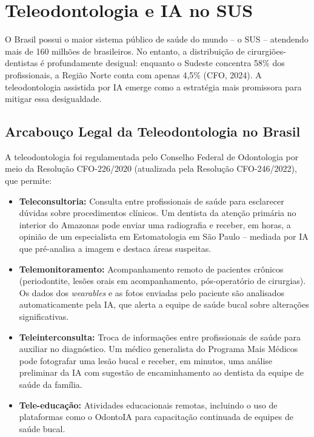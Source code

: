 \section{Teleodontologia e IA no SUS}
\label{sec:teleodontologia-sus}

\nivelquatro

O Brasil possui o maior sistema público de saúde do mundo -- o SUS -- atendendo
mais de 160 milhões de brasileiros. No entanto, a distribuição de
cirurgiões-dentistas é profundamente desigual: enquanto o Sudeste concentra 58\%
dos profissionais, a Região Norte conta com apenas 4,5\% (CFO, 2024). A
teleodontologia assistida por IA emerge como a estratégia mais promissora para
mitigar essa desigualdade.

 

\subsection{Arcabouço Legal da Teleodontologia no Brasil}

A teleodontologia foi regulamentada pelo Conselho Federal de Odontologia por
meio da Resolução CFO-226/2020 (atualizada pela Resolução CFO-246/2022), que
permite:

\begin{itemize}
  \item \textbf{Teleconsultoria:} Consulta entre profissionais de saúde para
    esclarecer dúvidas sobre procedimentos clínicos. Um dentista da atenção
    primária no interior do Amazonas pode enviar uma radiografia e receber, em
    horas, a opinião de um especialista em Estomatologia em São Paulo --
    mediada por IA que pré-analisa a imagem e destaca áreas suspeitas.

  \item \textbf{Telemonitoramento:} Acompanhamento remoto de pacientes crônicos
    (periodontite, lesões orais em acompanhamento, pós-operatório de cirurgias).
    Os dados dos \textit{wearables} e as fotos enviadas pelo paciente são
    analisados automaticamente pela IA, que alerta a equipe de saúde bucal
    sobre alterações significativas.

  \item \textbf{Teleinterconsulta:} Troca de informações entre profissionais
    de saúde para auxiliar no diagnóstico. Um médico generalista do Programa
    Mais Médicos pode fotografar uma lesão bucal e receber, em minutos, uma
    análise preliminar da IA com sugestão de encaminhamento ao dentista da
    equipe de saúde da família.

  \item \textbf{Tele-educação:} Atividades educacionais remotas, incluindo o
    uso de plataformas como o OdontoIA para capacitação continuada de equipes
    de saúde bucal.
\end{itemize}


